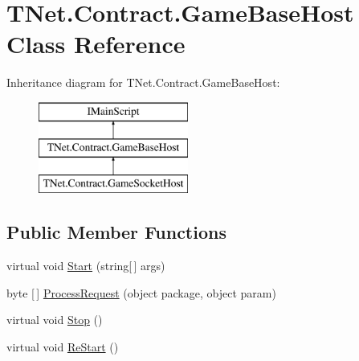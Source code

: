 \hypertarget{class_t_net_1_1_contract_1_1_game_base_host}{}\section{T\+Net.\+Contract.\+Game\+Base\+Host Class Reference}
\label{class_t_net_1_1_contract_1_1_game_base_host}


 


Inheritance diagram for T\+Net.\+Contract.\+Game\+Base\+Host\+:\begin{figure}[H]
\begin{center}
\leavevmode
\includegraphics[height=3.000000cm]{class_t_net_1_1_contract_1_1_game_base_host}
\end{center}
\end{figure}
\subsection*{Public Member Functions}
\begin{DoxyCompactItemize}
\item 
virtual void \mbox{\hyperlink{class_t_net_1_1_contract_1_1_game_base_host_a0bd4b389a68a6922ee0b76b4cfe9a388}{Start}} (string\mbox{[}$\,$\mbox{]} args)
\item 
byte \mbox{[}$\,$\mbox{]} \mbox{\hyperlink{class_t_net_1_1_contract_1_1_game_base_host_aadda55ed81d6461f0da196731c99a073}{Process\+Request}} (object package, object param)
\item 
virtual void \mbox{\hyperlink{class_t_net_1_1_contract_1_1_game_base_host_aa20602c8a29aa52506336a861de32692}{Stop}} ()
\item 
virtual void \mbox{\hyperlink{class_t_net_1_1_contract_1_1_game_base_host_aea75b7f594e1ec824cb1380ef1c6f18d}{Re\+Start}} ()
\end{DoxyCompactItemize}
